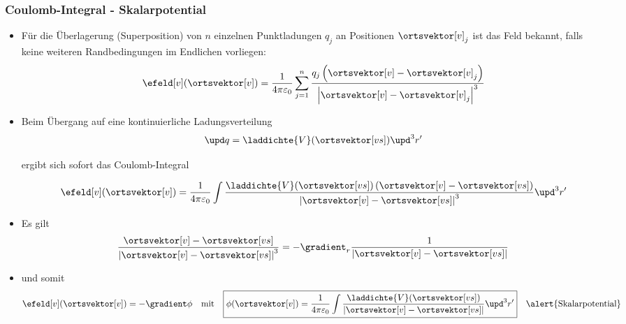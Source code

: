     \begin{frame}
      \frametitle{Coulomb-Integral - Skalarpotential}
      \begin{itemize}[<+->]
        \item Für die \alert{Überlagerung} (Superposition) von $n$
          einzelnen Punktladungen $q_j$ an Positionen $\ortsvektor[v]_j$ ist
          das Feld bekannt, falls keine weiteren
          \alert{Randbedingungen im Endlichen} vorliegen:
          $$
          \efeld[v] (\ortsvektor[v])= \frac{1}{4\pi\varepsilon_0} \sum_{j=1}^n \frac{q_j\left(\ortsvektor[v]-\ortsvektor[v]_j\right)}{\left|\ortsvektor[v]-\ortsvektor[v]_j\right|^3}
          $$
          \item Beim Übergang auf eine \alert{kontinuierliche
              Ladungsverteilung}
            $$
            \upd q =
            \laddichte{V}(\ortsvektor[vs])\upd^3r'$$

            ergibt sich sofort das \alert{Coulomb-Integral}

            $$
          \efeld[v] (\ortsvektor[v])= \frac{1}{4\pi\varepsilon_0}
          \int
          \frac{\laddichte{V}(\ortsvektor[vs])\left(\ortsvektor[v]-\ortsvektor[vs]\right)}{\left|\ortsvektor[v]-\ortsvektor[vs]\right|^3
          } \upd^3r'
          $$
        \item Es gilt
          $$
          \frac{\ortsvektor[v]-\ortsvektor[vs]}{\left|\ortsvektor[v]-\ortsvektor[vs]\right|^3}
            = -\gradient_r \frac{1}{\left|\ortsvektor[v]-\ortsvektor[vs]\right|}
            $$
          \item und somit
            $$
            \efeld[v](\ortsvektor[v]) = -\gradient \phi \quad\text{mit}\quad
            \boxed{\phi(\ortsvektor[v]) = \frac{1}{4\pi\varepsilon_0}
          \int
          \frac{\laddichte{V}(\ortsvektor[vs])}{\left|\ortsvektor[v]-\ortsvektor[vs]\right|} \upd^3r'} \quad\alert{\text{Skalarpotential}}
            $$
        \end{itemize}
      \end{frame}
    
